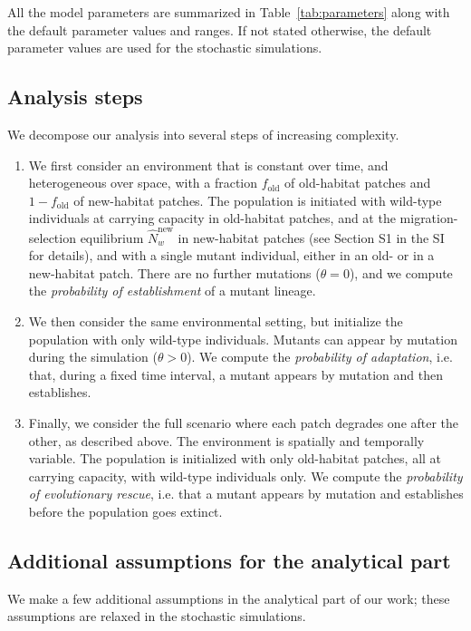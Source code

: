 \documentclass[11pt]{article}
\begin{document}
 All the model parameters are summarized in Table~\ref{tab:parameters} along with the default parameter values and ranges. If not stated otherwise, the default parameter values are used for the stochastic simulations. 

\subsection*{Analysis steps}
We decompose our analysis into several steps of increasing complexity. 
\begin{enumerate}
	\item We first consider an environment that is constant over time, and heterogeneous over space, with a fraction $f_{\text{old}}$ of old-habitat patches and $1-f_{\text{old}}$ of new-habitat patches. The population is initiated with wild-type individuals at carrying capacity in old-habitat patches, and at the migration-selection equilibrium $\widehat{N}_w^{\text{new}}$ in new-habitat patches (see Section S1 in the SI for details), 
	and with a single mutant individual, either in an old- or in a new-habitat patch. There are no further mutations ($\theta = 0$), and we compute the \textit{probability of establishment} of a mutant lineage. 
	\item We then consider the same environmental setting, but initialize the population with only wild-type individuals. Mutants can appear by mutation during the simulation ($\theta >0$). We compute the \textit{probability of adaptation}, i.e. that, during a fixed time interval, a mutant appears by mutation and then establishes. 
	\item Finally, we consider the full scenario where each patch degrades one after the other, as described above. The environment is spatially and temporally variable. The population is initialized with only old-habitat patches, all at carrying capacity, with wild-type individuals only. We compute the \textit{probability of evolutionary rescue}, i.e. that a mutant appears by mutation and establishes before the population goes extinct. 
\end{enumerate}



\subsection*{Additional assumptions for the analytical part}
We make a few additional assumptions in the analytical part of our work; these assumptions are relaxed in the stochastic simulations. 
\end{document}
